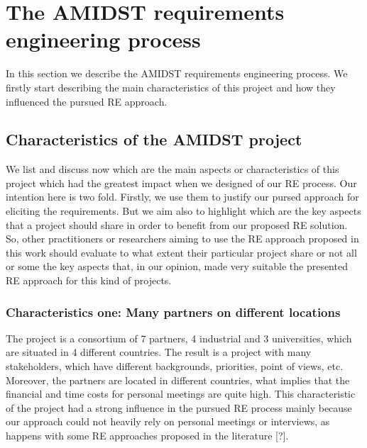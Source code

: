 \documentclass[11pt, oneside]{article}   	%
\begin{document}
\section{The AMIDST requirements engineering process}
\label{sec:AmidstRequirementProcess}

In this section we describe the AMIDST requirements engineering process.  We firstly start describing the main characteristics of this project and how they influenced the pursued RE approach. 

\subsection{Characteristics of the AMIDST project}
\label{sec:characteristics}

We list and discuss now which are the main aspects or characteristics of this project which had the greatest impact when we designed of our RE process. Our intention here is two fold. Firstly, we use them to justify our pursed approach for eliciting the requirements. But we aim also to highlight which are the key aspects that a project should share in order to benefit from our proposed RE solution. So, other practitioners or researchers aiming to use the RE approach proposed in this work should evaluate to what extent their particular project share or not all or some the key aspects that, in our opinion, made very suitable the presented RE approach for this kind of projects. 

\subsubsection*{Characteristics one: Many partners on different locations}
\label{sec:characteristic1}
The project is a consortium of 7 partners, 4 industrial and 3 universities, which are situated in 4 different countries.  The result is a project with many stakeholders, which have different backgrounds, priorities, point of views, etc. Moreover, the partners are located in different countries, what implies that the financial and time costs for personal meetings are quite high.  This characteristic of the project had a strong influence in the pursued RE process mainly because our approach could not heavily rely on personal meetings or interviews, as happens with some RE approaches proposed in the literature [?]. 
\end{document}
